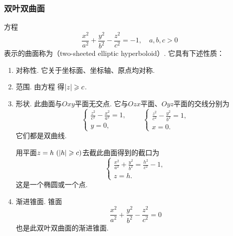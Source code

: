 \subsubsection{双叶双曲面}
方程\begin{equation}\label{equation:解析几何.双叶双曲面}
	\frac{x^2}{a^2}+\frac{y^2}{b^2}-\frac{z^2}{c^2}=-1,
	\quad a,b,c>0
\end{equation}
表示的曲面称为（two-sheeted elliptic hyperboloid）.
它具有下述性质：
\begin{enumerate}
	\item 对称性.
	它关于坐标面、坐标轴、原点均对称.

	\item 范围.
	由方程  得\(\abs{z} \geqslant c\).

	\item 形状.
	此曲面与\(Oxy\)平面无交点.
	它与\(Ozx\)平面、\(Oyz\)平面的交线分别为\[
		\left\{ \begin{array}{l}
			\frac{z^2}{c^2}-\frac{x^2}{a^2}=1, \\
			y = 0,
		\end{array} \right.
		\qquad
		\left\{ \begin{array}{l}
			\frac{z^2}{c^2}-\frac{y^2}{b^2}=1, \\
			x = 0.
		\end{array} \right.
	\]
	它们都是双曲线.

	用平面\(z=h\ (\abs{h}\geqslant c)\)去截此曲面得到的截口为\[
		\left\{ \begin{array}{l}
			\frac{x^2}{a^2}+\frac{y^2}{b^2}=\frac{h^2}{c^2}-1, \\
			z = h.
		\end{array} \right.
	\]
	这是一个椭圆或一个点.

	\item 渐进锥面.
	锥面\[
		\frac{x^2}{a^2}+\frac{y^2}{b^2}-\frac{z^2}{c^2}=0
	\]也是此双叶双曲面的渐进锥面.
\end{enumerate}

